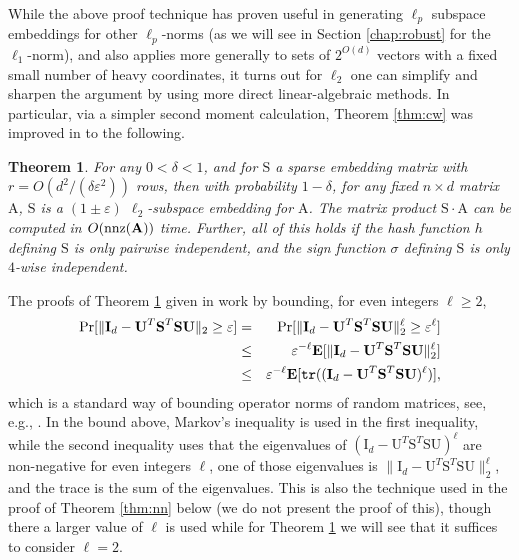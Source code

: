 \documentclass[11pt]{article}
\newtheorem{theorem}{Theorem}
\newcommand{\mat}[1]{{\ensuremath{\bm{\mathrm{#1}}}}}
\def\matA{\mat{A}}
\def\matI{\mat{I}}
\def\matS{\mat{S}}
\def\matU{\mat{U}}
\def\nnz{{ \rm nnz }}
\newcommand{\eps}{\varepsilon}
\DeclareMathOperator{\tr}{\mathtt{tr}}
\begin{document}
While the above proof technique has proven useful in generating $\ell_p$ subspace embeddings for other $\ell_p$-norms
(as we will see in Section \ref{chap:robust} for the $\ell_1$-norm), 
and also applies more generally to sets of $2^{O(d)}$ vectors with a fixed small number of heavy coordinates, 
it turns out for $\ell_2$ one can simplify and sharpen the argument by using 
more direct linear-algebraic methods.
In particular, via a simpler second moment calculation, Theorem \ref{thm:cw} 
was improved in \cite{MM13,JH13} to the following.
\begin{theorem}\label{thm:mmnn}\cite{MM13,JH13}
For any $0 < \delta < 1$, and for $\matS$ a sparse embedding matrix with $r = O(d^2/(\delta \eps^2))$ rows, 
then with probability $1-\delta$, for any fixed $n \times d$
matrix $\matA$, $\matS$ is a $(1 \pm \eps)$ $\ell_2$-subspace embedding for $\matA$. 
The matrix product 
$\matS \cdot \matA$ can be computed in $O(\nnz(\matA))$ time. Further, all of this holds if the hash function
$h$ defining $\matS$ is only pairwise independent, and the sign function $\sigma$ defining $\matS$ is only
$4$-wise independent. 
\end{theorem}
The proofs of Theorem \ref{thm:mmnn} given in \cite{MM13,JH13} work by bounding, for even integers $\ell \geq 2$,
\begin{eqnarray*}
\Pr[\|\matI_d-\matU^T\matS^T\matS\matU\|_2 \geq \eps]
& = & \Pr[\|\matI_d -\matU^T\matS^T\matS\matU\|_2^{\ell} \geq \eps^{\ell}]\\
& \leq & \eps^{-{\ell}}{\bf E}[\|\matI_d-\matU^T\matS^T\matS\matU\|_2^{\ell}]\\
& \leq & \eps^{-{\ell}} {\bf E}[\tr((\matI_d-\matU^T\matS^T\matS\matU)^{\ell})],
\end{eqnarray*}
which is a standard way of bounding operator norms of random matrices, see, e.g., \cite{by93}. 
In the bound above, Markov's inequality is used in the first inequality, while the second inequality
uses that the eigenvalues of $(\matI_d - \matU^T\matS^T\matS\matU)^{\ell}$ are non-negative for even integers
$\ell$, one of those eigenvalues is $\|\matI_d-\matU^T\matS^T\matS\matU\|_2^{\ell}$, and the trace is the sum
of the eigenvalues. 
This is also the technique
used in the proof of Theorem \ref{thm:nn} below (we do not present the proof of this), 
though there a larger value of $\ell$ is used while
for Theorem \ref{thm:mmnn} we will see that it suffices to consider $\ell = 2$. 
\end{document}
